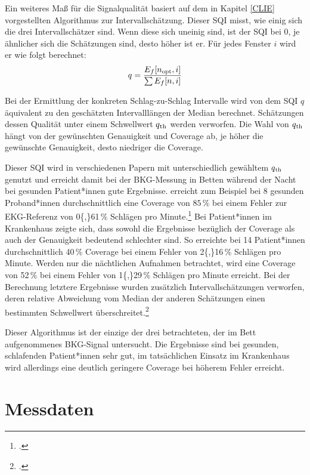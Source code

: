 	Ein weiteres Maß für die Signalqualität basiert auf dem in Kapitel \ref{CLIE} vorgestellten Algorithmus zur Intervallschätzung. Dieser \acl{SQI} misst, wie einig sich die drei Intervallschätzer sind. Wenn diese sich uneinig sind, ist der \ac{SQI} bei 0, je ähnlicher sich die Schätzungen sind, desto höher ist er. Für jedes Fenster $i$ wird er wie folgt berechnet: \[ q = \frac{E_f[n\textsubscript{opt}, i]}{\sum E_f[n, i]} \] %
	
	Bei der Ermittlung der konkreten Schlag-zu-Schlag Intervalle wird von dem \ac{SQI} $q$ äquivalent zu den geschätzten Intervalllängen der Median berechnet. Schätzungen dessen Qualität unter einem Schwellwert $q\textsubscript{th}$ werden verworfen. Die Wahl von $q\textsubscript{th}$ hängt von der gewünschten Genauigkeit und Coverage ab, je höher die gewünschte Genauigkeit, desto niedriger die Coverage.
	
	Dieser \ac{SQI} wird in verschiedenen Papern mit unterschiedlich gewähltem $q\textsubscript{th}$ genutzt und erreicht damit bei der \ac{BKG}-Messung in Betten während der Nacht bei gesunden Patient*innen gute Ergebnisse. \citeauthor{Bruser2013} erreicht zum Beispiel bei 8 gesunden Proband*innen durchschnittlich eine Coverage von $85\,\%$ bei einem Fehler zur \ac{EKG}-Referenz von \num{0{,}61}\,\% Schlägen pro Minute.\footcite[Vgl.][]{Bruser2013} Bei Patient*innen im Krankenhaus zeigte sich, dass sowohl die Ergebnisse bezüglich der Coverage als auch der Genauigkeit bedeutend schlechter sind. So erreichte \citeauthor{HoogAntink2020} bei 14 Patient*innen durchschnittlich \num{40}\,\% Coverage bei einem Fehler von \num{2{,}16}\,\% Schlägen pro Minute. Werden nur die nächtlichen Aufnahmen betrachtet, wird eine Coverage von \num{52}\,\% bei einem Fehler von \num{1{,}29}\,\% Schlägen pro Minute erreicht. Bei der Berechnung letztere Ergebnisse wurden zusätzlich Intervallschätzungen verworfen, deren relative Abweichung vom Median der anderen Schätzungen einen bestimmten Schwellwert überschreitet.\footcite[Vgl.][]{HoogAntink2020}
	
	Dieser Algorithmus ist der einzige der drei betrachteten, der im Bett aufgenommenes \ac{BKG}-Signal untersucht. Die Ergebnisse sind bei gesunden, schlafenden Patient*innen sehr gut, im tatsächlichen Einsatz im Krankenhaus wird allerdings eine deutlich geringere Coverage bei höherem Fehler erreicht.
	
\section{Messdaten}

